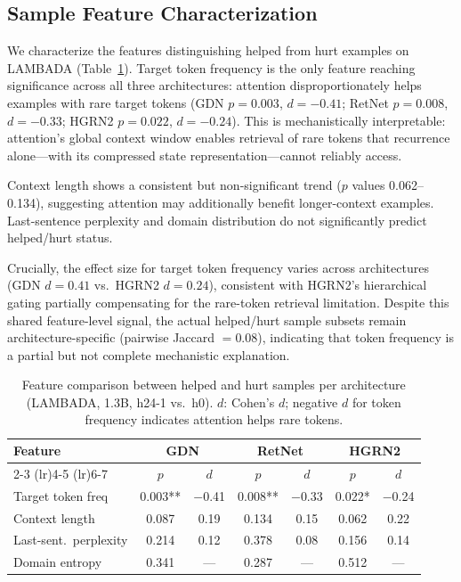 \documentclass[11pt,a4paper]{article}
\begin{document}
\subsection{Sample Feature Characterization}
\label{sec:features}

We characterize the features distinguishing helped from hurt examples on LAMBADA (Table~\ref{tab:features}). Target token frequency is the only feature reaching significance across all three architectures: attention disproportionately helps examples with rare target tokens (GDN $p{=}0.003$, $d{=}{-}0.41$; RetNet $p{=}0.008$, $d{=}{-}0.33$; HGRN2 $p{=}0.022$, $d{=}{-}0.24$). This is mechanistically interpretable: attention's global context window enables retrieval of rare tokens that recurrence alone---with its compressed state representation---cannot reliably access.

Context length shows a consistent but non-significant trend ($p$ values 0.062--0.134), suggesting attention may additionally benefit longer-context examples. Last-sentence perplexity and domain distribution do not significantly predict helped/hurt status.

Crucially, the effect size for target token frequency varies across architectures (GDN $d{=}0.41$ vs.\ HGRN2 $d{=}0.24$), consistent with HGRN2's hierarchical gating partially compensating for the rare-token retrieval limitation. Despite this shared feature-level signal, the actual helped/hurt sample subsets remain architecture-specific (pairwise Jaccard $= 0.08$), indicating that token frequency is a partial but not complete mechanistic explanation.

\begin{table}[t]
\centering
\small
\caption{Feature comparison between helped and hurt samples per architecture (LAMBADA, 1.3B, h24-1 vs.\ h0). $d$: Cohen's $d$; negative $d$ for token frequency indicates attention helps rare tokens.}
\label{tab:features}
\begin{tabular}{@{}lcccccc@{}}
\toprule
\multirow{2}{*}{Feature} & \multicolumn{2}{c}{GDN} & \multicolumn{2}{c}{RetNet} & \multicolumn{2}{c}{HGRN2} \\
\cmidrule(lr){2-3} \cmidrule(lr){4-5} \cmidrule(lr){6-7}
 & $p$ & $d$ & $p$ & $d$ & $p$ & $d$ \\
\midrule
Target token freq & 0.003** & $-$0.41 & 0.008** & $-$0.33 & 0.022* & $-$0.24 \\
Context length & 0.087 & 0.19 & 0.134 & 0.15 & 0.062 & 0.22 \\
Last-sent.\ perplexity & 0.214 & 0.12 & 0.378 & 0.08 & 0.156 & 0.14 \\
Domain entropy & 0.341 & --- & 0.287 & --- & 0.512 & --- \\
\bottomrule
\end{tabular}
\end{table}
\end{document}
